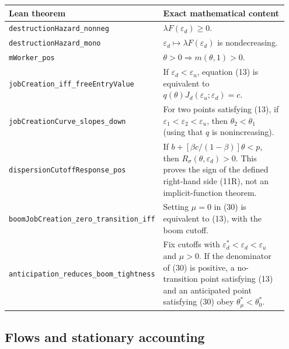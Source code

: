 \documentclass[11pt]{article}
\newcommand{\breakcode}[1]{\nolinkurl{#1}}
\newcommand{\epsd}{\varepsilon_d}
\newcommand{\epsu}{\varepsilon_u}
\newcommand{\mworker}[1]{m(#1,1)}
\begin{document}
\begin{longtable}{@{}p{0.35\linewidth}p{0.60\linewidth}@{}}
\toprule
\textbf{Lean theorem} & \textbf{Exact mathematical content} \\
\midrule
\endhead
\breakcode{destructionHazard_nonneg} & $\lambda F(\epsd)\ge0$. \\
\breakcode{destructionHazard_mono} & $\epsd\mapsto\lambda F(\epsd)$ is
nondecreasing. \\
\breakcode{mWorker_pos} & $\theta>0\Rightarrow\mworker{\theta}>0$. \\
\breakcode{jobCreation_iff_freeEntryValue} & If $\epsd<\epsu$, equation (13) is
equivalent to $q(\theta)J_d(\epsu;\epsd)=c$. \\
\breakcode{jobCreationCurve_slopes_down} & For two points satisfying (13), if
$\varepsilon_1<\varepsilon_2<\epsu$, then $\theta_2<\theta_1$ (using that $q$ is
nonincreasing). \\
\breakcode{dispersionCutoffResponse_pos} & If
$b+[\beta c/(1-\beta)]\theta<p$, then $R_\sigma(\theta,\epsd)>0$. This proves the
sign of the defined right-hand side (11R), not an implicit-function theorem. \\
\breakcode{boomJobCreation_zero_transition_iff} & Setting $\mu=0$ in (30) is
equivalent to (13), with the boom cutoff. \\
\breakcode{anticipation_reduces_boom_tightness} & Fix cutoffs with
$\epsd^*<\epsd<\epsu$ and $\mu>0$. If the denominator of (30) is positive, a
no-transition point satisfying (13) and an anticipated point satisfying (30) obey
$\theta^*_{\mu}<\theta^*_0$. \\
\bottomrule
\end{longtable}

\subsection{Flows and stationary accounting}
\end{document}
